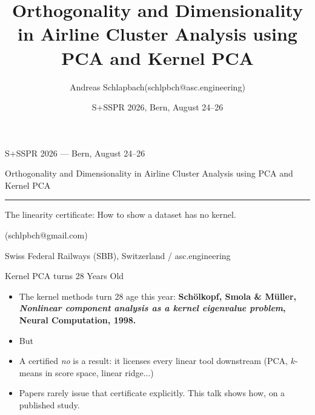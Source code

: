\documentclass[10pt,aspectratio=169]{beamer}
\title[Orthogonality \& Dimensionality in Airline Cluster Analysis]%
  {Orthogonality and Dimensionality in Airline Cluster Analysis using PCA and Kernel PCA}
\author{Andreas Schlapbach(schlpbch@asc.engineering)}
\date{S+SSPR 2026, Bern, August 24--26}
\begin{document}
\begin{frame}[plain]
  \vspace*{0.9cm}
  {\plexmedium\small\color{ascTeal600}S+SSPR 2026 --- Bern, August 24--26\par}
  \vspace{0.35cm}
  {%
    Orthogonality and Dimensionality in Airline Cluster Analysis using PCA and Kernel PCA\par}
  \vspace{0.18cm}
  {\color{ascTeal500}\rule{28pt}{2.4pt}\par}
  \vspace{0.30cm}
  {\large{The linearity certificate: How to show a dataset has no kernel.}\par}
  \vspace{0.85cm}
	{ (schlpbch@gmail.com)\par}
  \vspace{0.10cm}
  {%
    Swiss Federal Railways (SBB), Switzerland /
    {\color{ascTeal600}asc.engineering}
    }
\end{frame}


\begin{frame}{Kernel PCA turns 28 Years Old} 
  \begin{itemize}
    \item{The kernel methods turn 28 age this year:  \textbf{Sch\"olkopf, Smola \& M\"uller, \emph{Nonlinear component analysis as a kernel eigenvalue problem}, Neural Computation, 1998.}}

    \item{But }

    \item{A certified \emph{no} is a result: it licenses every linear tool
	    downstream (PCA, $k$-means in score space, linear ridge...)}
    \item{Papers rarely issue that certificate explicitly. This talk shows
	    how, on a published study.}
  \end{itemize}
\end{frame}
\end{document}
